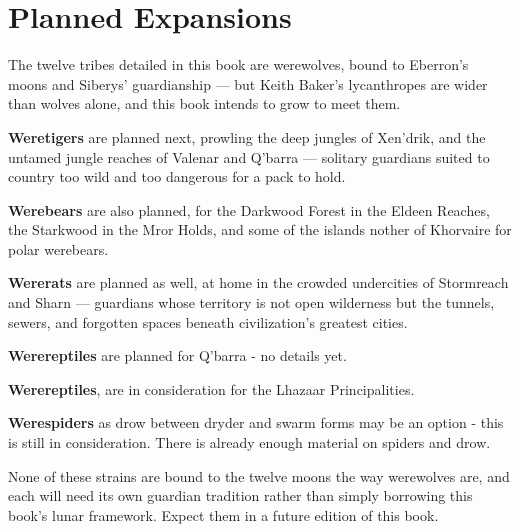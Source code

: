 \documentclass[twocolumn]{dndbook}
\begin{document}
\section*{Planned Expansions}

The twelve tribes detailed in this book are werewolves, bound to Eberron's moons and Siberys' guardianship --- but Keith Baker's lycanthropes are wider than wolves alone, and this book intends to grow to meet them.

\textbf{Weretigers} are planned next, prowling the deep jungles of Xen'drik, and the untamed jungle reaches of Valenar and Q'barra --- solitary guardians suited to country too wild and too dangerous for a pack to hold.

\textbf{Werebears} are also planned, for the Darkwood Forest in the Eldeen Reaches, the Starkwood in the Mror Holds, and some of the islands nother of Khorvaire for polar werebears.

\textbf{Wererats} are planned as well, at home in the crowded undercities of Stormreach and Sharn --- guardians whose territory is not open wilderness but the tunnels, sewers, and forgotten spaces beneath civilization's greatest cities.

\textbf{Werereptiles} are planned for Q'barra - no details yet.

\textbf{Werereptiles}, are in consideration for the Lhazaar Principalities.

\textbf{Werespiders} as drow between dryder and swarm forms may be an option - this is still in consideration. There is already enough material on spiders and drow.

None of these strains are bound to the twelve moons the way werewolves are, and each will need its own guardian tradition rather than simply borrowing this book's lunar framework.
Expect them in a future edition of this book.
\end{document}
